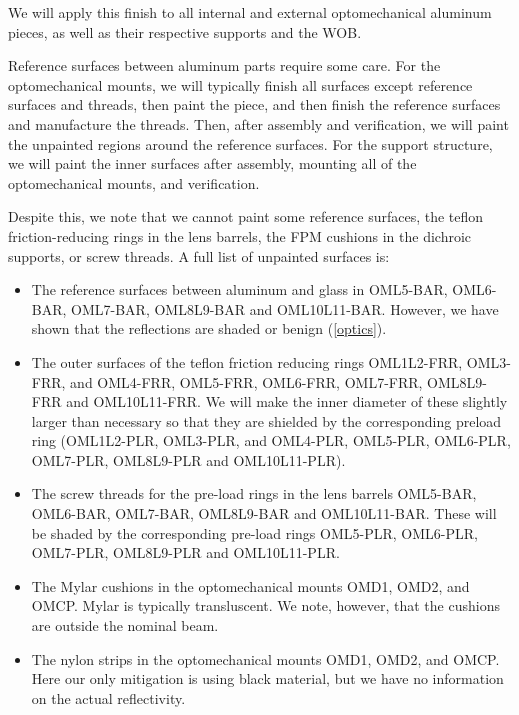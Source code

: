 \documentclass{report}
\begin{document}
We will apply this finish to all internal and external optomechanical aluminum pieces, as well as their respective supports and the WOB.  

Reference surfaces between aluminum parts require some care. For the optomechanical mounts, we will typically finish all surfaces except reference surfaces and threads, then paint the piece, and then finish the reference surfaces and manufacture the threads. Then, after assembly and verification, we will paint the unpainted regions around the reference surfaces. For the support structure, we will paint the inner surfaces after assembly, mounting all of the optomechanical mounts, and verification.

Despite this, we note that we cannot paint some reference surfaces, the teflon friction-reducing rings in the lens barrels, the FPM cushions in the dichroic supports, or screw threads. A full list of unpainted surfaces is:

\begin{itemize}
\item
The reference surfaces between aluminum and glass in  OML5-BAR, OML6-BAR, OML7-BAR, OML8L9-BAR and OML10L11-BAR. However, we have shown that the reflections are shaded or benign (\ref{optics}).
\item
The outer surfaces of the teflon friction reducing rings OML1L2-FRR, OML3-FRR, and OML4-FRR, OML5-FRR, OML6-FRR, OML7-FRR, OML8L9-FRR and OML10L11-FRR. We will make the inner diameter of these slightly larger than necessary so that they are shielded by the corresponding preload ring (OML1L2-PLR, OML3-PLR, and OML4-PLR, OML5-PLR, OML6-PLR, OML7-PLR, OML8L9-PLR and OML10L11-PLR).
\item
The screw threads for the pre-load rings in the lens barrels OML5-BAR, OML6-BAR, OML7-BAR, OML8L9-BAR and OML10L11-BAR. These will be shaded by the corresponding pre-load rings OML5-PLR, OML6-PLR, OML7-PLR, OML8L9-PLR and OML10L11-PLR.
\item
The Mylar cushions in the optomechanical mounts OMD1, OMD2, and OMCP. Mylar is typically transluscent. We note, however, that the cushions are outside the nominal beam.
\item
The nylon strips in the optomechanical mounts OMD1, OMD2, and OMCP. Here our only mitigation is using black material, but we have no information on the actual reflectivity. 
\end{itemize}
\end{document}
